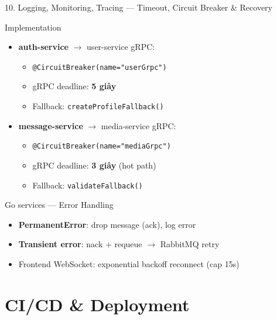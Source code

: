 \documentclass[aspectratio=169,compress]{beamer}
\begin{document}
\begin{frame}{10. Logging, Monitoring, Tracing --- Timeout, Circuit Breaker \& Recovery}
\begin{block}{Implementation}
\begin{itemize}
  \item \textbf{auth-service} $\rightarrow$ user-service gRPC:
    \begin{itemize}
      \item \small \texttt{@CircuitBreaker(name="userGrpc")}
      \item \small gRPC deadline: \textbf{5 giây}
      \item \small Fallback: \texttt{createProfileFallback()}
    \end{itemize}
  \item \textbf{message-service} $\rightarrow$ media-service gRPC:
    \begin{itemize}
      \item \small \texttt{@CircuitBreaker(name="mediaGrpc")}
      \item \small gRPC deadline: \textbf{3 giây} (hot path)
      \item \small Fallback: \texttt{validateFallback()}
    \end{itemize}
\end{itemize}
\end{block}
\begin{block}{Go services --- Error Handling}
\begin{itemize}
  \item \textbf{PermanentError}: drop message (ack), log error
  \item \textbf{Transient error}: nack + requeue $\rightarrow$ RabbitMQ retry
  \item Frontend WebSocket: exponential backoff reconnect (cap 15s)
\end{itemize}
\end{block}
\end{frame}

\section{CI/CD \& Deployment}
\end{document}
